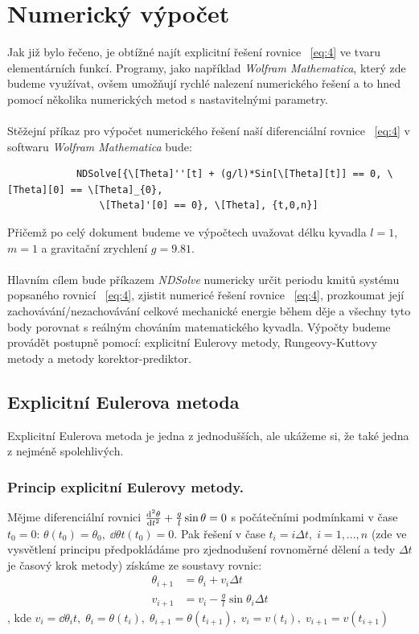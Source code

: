 \documentclass[reqno, a4paper]{amsart}
\begin{document}
		\section{Numerický výpočet}
		Jak již bylo řečeno, je obtížné najít explicitní řešení rovnice ~\eqref{eq:4} ve tvaru elementárních funkcí. Programy, jako například \textit{Wolfram Mathematica}, který zde budeme využívat, ovšem umožňují rychlé nalezení numerického řešení a to hned pomocí několika numerických metod s nastavitelnými parametry.\
		\\
		\\
		Stěžejní příkaz pro výpočet numerického řešení naší diferenciální rovnice ~\eqref{eq:4} v softwaru \textit{Wolfram Mathematica} bude:
		\begin{verbatim}
			NDSolve[{\[Theta]''[t] + (g/l)*Sin[\[Theta][t]] == 0, \[Theta][0] == \[Theta]_{0}, 
				\[Theta]'[0] == 0}, \[Theta], {t,0,n}]
		\end{verbatim}
		Přičemž po celý dokument budeme ve výpočtech uvažovat délku kyvadla $ l=1 $, $ m=1 $ a gravitační zrychlení $ g=9.81 $.
		\\
		\\
		Hlavním cílem bude příkazem \textit{NDSolve} numericky určit periodu kmitů systému popsaného rovnicí ~\eqref{eq:4}, zjistit numericé řešení rovnice ~\eqref{eq:4}, prozkoumat její zachovávání/nezachovávání celkové mechanické energie během děje a všechny tyto body porovnat s reálným chováním matematického kyvadla. Výpočty budeme provádět postupně pomocí: explicitní Eulerovy metody, Rungeovy-Kuttovy metody a metody korektor-prediktor.
		\subsection{Explicitní Eulerova metoda}
		Explicitní Eulerova metoda je jedna z jednodušších, ale ukážeme si, že také jedna z nejméně spolehlivých.
		\\
		\subsubsection{Princip explicitní Eulerovy metody.} Mějme diferenciální rovnici $\frac{\mathrm{d}^2 {\theta}}{\mathrm{d} {t}^2} + \frac{g}{l} \sin \theta = 0$ s počátečními podmínkami v čase $t_{0}=0$: $\theta(t_{0})=\theta_{0},\; \dd{\theta}{t}(t_{0})=0$. Pak řešení v čase $t_{i}=i\Delta t,\; i=1,...,n$ (zde ve vysvětlení principu předpokládáme pro zjednodušení rovnoměrné dělení a tedy $ \Delta t$ je časový krok metody) získáme ze soustavy rovnic: 
		\begin{align}
			\theta_{i+1}& =\theta_{i}+v_{i}\Delta t\\
			v_{i+1}& =v_{i}-\frac{g}{l}\sin\theta_{i}\Delta t
		\end{align}
		, kde $ v_{i}=\dd{\theta_{i}}{t},\; \theta_{i}=\theta(t_{i}),\;\theta_{i+1}=\theta(t_{i+1}),\;v_{i}=v(t_{i}),\;v_{i+1}=v(t_{i+1})$
		\\
\end{document}
